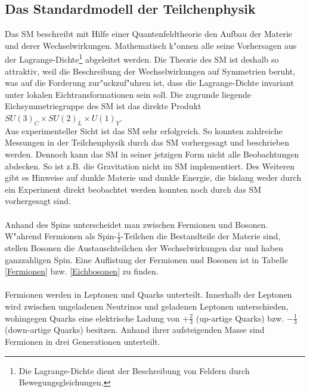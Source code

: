 \subsection{Das Standardmodell der Teilchenphysik}
\label{kapsm}
Das SM beschreibt mit Hilfe einer Quantenfeldtheorie den Aufbau der Materie und derer Wechselwirkungen. Mathematisch k"onnen alle seine Vorhersagen aus der Lagrange-Dichte\footnote{Die Lagrange-Dichte dient der Beschreibung von Feldern durch Bewegungsgleichungen.} abgeleitet werden. Die Theorie des SM ist deshalb so attraktiv, weil die Beschreibung der Wechselwirkungen auf Symmetrien beruht, was auf die Forderung zur"uckzuf"uhren ist, dass die Lagrange-Dichte invariant unter lokalen Eichtransformationen sein soll. Die zugrunde liegende Eichsymmetriegruppe des SM ist das direkte Produkt $SU(3)_{C} \times SU(2)_{L} \times U(1)_{Y}$.\\
Aus experimenteller Sicht ist das SM sehr erfolgreich. So konnten zahlreiche Messungen in der Teilchenphysik durch das SM vorhergesagt und beschrieben werden. Dennoch kann das SM in seiner jetzigen Form nicht alle Beobachtungen abdecken. So ist z.B. die Gra\-vi\-ta\-tion nicht im SM implementiert. Des Weiteren gibt es Hinweise auf dunkle Materie und dunkle Energie, die bislang weder durch ein Experiment direkt beobachtet werden konnten noch durch das SM vorhergesagt sind.
\\
\\
Anhand des Spins unterscheidet man zwischen Fermionen und Bosonen. W"ahrend Fermionen als Spin-$\frac{1}{2}$-Teilchen die Bestandteile der Materie sind, stellen Bosonen die Austauschteilchen der Wechselwirkungen dar und haben ganzzahligen Spin. Eine Auflistung der Fermionen und Bosonen ist in Tabelle \ref{Fermionen} bzw. \ref{Eichbosonen} zu finden.\\
\\
Fermionen werden in Leptonen und Quarks unterteilt. Innerhalb der Leptonen wird zwischen ungeladenen Neutrinos und geladenen Leptonen unterschieden, wohingegen Quarks eine elektrische Ladung von $+\frac{2}{3}$ (up-artige Quarks) bzw. $-\frac{1}{3}$ (down-artige Quarks) besitzen. Anhand ihrer aufsteigenden Masse sind Fermionen in drei Generationen unterteilt.
